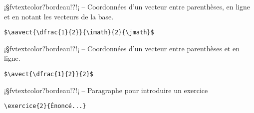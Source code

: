 \documentclass[11pt,a4paper,rgb]{report}
\begin{document}
\setlength{\leftskip}{0pt}
\setlength{\textwidth}{18cm}%


\vspace*{.75cm}

\inCodeStub¡§fvtextcolor?bordeau!?!¡ -- Coordonnées d'un vecteur entre parenthèses, en ligne et en notant les vecteurs de la base.

\setlength{\leftskip}{.75cm}%
\setlength{\textwidth}{17.25cm}%

\colorbox{blue!15}{}
\hfill
\begin{minipage}{.65\textwidth}
	\begin{lstlisting}[linewidth=\textwidth, language={[LaTeX]TeX}]
	$\aavect{\dfrac{1}{2}}{\imath}{2}{\jmath}$
	\end{lstlisting}
\end{minipage}

\setlength{\leftskip}{0pt}
\setlength{\textwidth}{18cm}%


\vspace*{.75cm}

\inCodeStub¡§fvtextcolor?bordeau!?!¡ -- Coordonnées d'un vecteur entre parenthèses et en ligne.

\setlength{\leftskip}{.75cm}%
\setlength{\textwidth}{17.25cm}%

\colorbox{blue!15}{}
\hfill
\begin{minipage}{.65\textwidth}
	\begin{lstlisting}[linewidth=\textwidth, language={[LaTeX]TeX}]
	$\avect{\dfrac{1}{2}}{2}$
	\end{lstlisting}
\end{minipage}

\setlength{\leftskip}{0pt}
\setlength{\textwidth}{18cm}%


\vspace*{.75cm}

\inCodeStub¡§fvtextcolor?bordeau!?!¡ -- Paragraphe pour introduire un exercice

\setlength{\leftskip}{.75cm}%
\setlength{\textwidth}{17.25cm}%

\hfill
\begin{minipage}{.65\textwidth}
	\begin{lstlisting}[linewidth=\textwidth, language={[LaTeX]TeX}]
	\exercice{2}{Énoncé...}
	\end{lstlisting}
\end{minipage}
\end{document}
